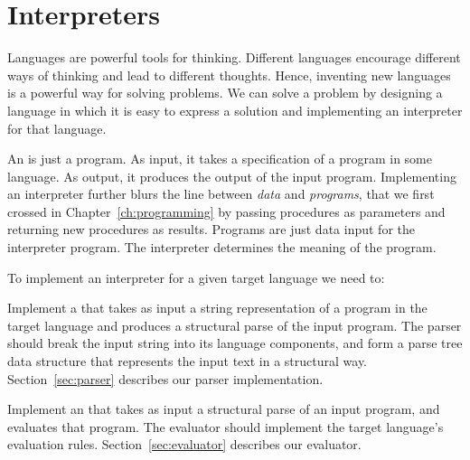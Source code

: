 \chapter{Interpreters}\label{ch:interpreters}





Languages are powerful tools for thinking.  Different languages encourage different ways of thinking and lead to different thoughts.  Hence, inventing new languages is a powerful way for solving problems.  We can solve a problem by designing a language in which it is easy to express a solution and implementing an interpreter for that language.  

An  is just a program.  As input, it takes a specification of a program in some language.  As output, it produces the output of the input program.  Implementing an interpreter further blurs the line between \emph{data} and \emph{programs}, that we first crossed in Chapter~\ref{ch:programming} by passing procedures as parameters and returning new procedures as results.  Programs are just data input for the interpreter program.  The interpreter determines the meaning of the program.  

To implement an interpreter for a given target language we need to:
\begin{enumtight}
\item Implement a  that takes as input a string representation of a program in the target language and produces a structural parse of the input program.  The parser should break the input string into its language components, and form a parse tree data structure that represents the input text in a structural way.  Section~\ref{sec:parser} describes our parser implementation.  
\item Implement an  that takes as input a structural parse of an input program, and evaluates that program.  The evaluator should implement the target language's evaluation rules. Section~\ref{sec:evaluator} describes our evaluator.
\end{enumtight}

